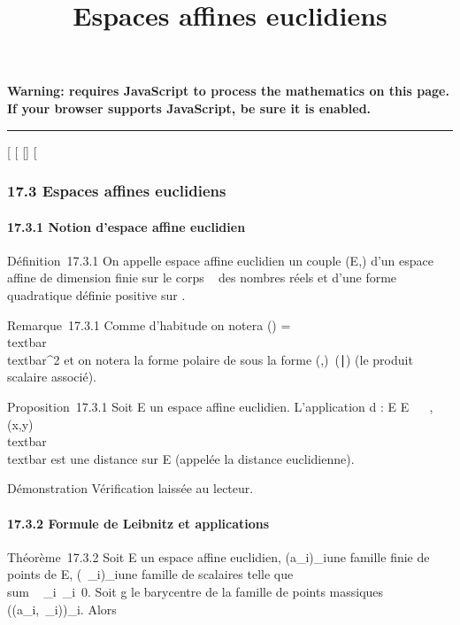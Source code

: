 \documentclass[]{article}
\title{Espaces affines euclidiens}
\author{}
\date{}
\begin{document}
\maketitle

\textbf{Warning: 
requires JavaScript to process the mathematics on this page.\\ If your
browser supports JavaScript, be sure it is enabled.}

\begin{center}\rule{3in}{0.4pt}\end{center}

{[}
{[}
{[}{]}
{[}

\subsubsection{17.3 Espaces affines euclidiens}

\paragraph{17.3.1 Notion d'espace affine euclidien}

Définition~17.3.1 On appelle espace affine euclidien un couple (E,\Phi)
d'un espace affine de dimension finie sur le corps ~ des nombres réels
et d'une forme quadratique définie positive \Phi sur
\overrightarrowE.

Remarque~17.3.1 Comme d'habitude on notera
\Phi(\overrightarrow\xi)
=\\textbar{}\overrightarrow
\xi\\textbar{}^2 et on notera la forme polaire
de \Phi sous la forme
(\overrightarrow\xi,\overrightarrow\eta)\mapsto~(\overrightarrow\xi\mathrel∣\overrightarrow\eta)
(le produit scalaire associé).

Proposition~17.3.1 Soit E un espace affine euclidien. L'application d :
E \times E \rightarrow~ ~,
(x,y)\mapsto~\\textbar{}\overrightarrowxy\\textbar{}
est une distance sur E (appelée la distance euclidienne).

Démonstration Vérification laissée au lecteur.

\paragraph{17.3.2 Formule de Leibnitz et applications}

Théorème~17.3.2 Soit E un espace affine euclidien,
(a\_i)\_i\inI une famille finie de points de E,
(\lambda~\_i)\_i\inI une famille de scalaires telle que
\\sum ~
\_i\inI\lambda~\_i\neq~0. Soit g le
barycentre de la famille de points massiques \left
((a\_i,\lambda~\_i)\right )\_i\inI. Alors
\end{document}
